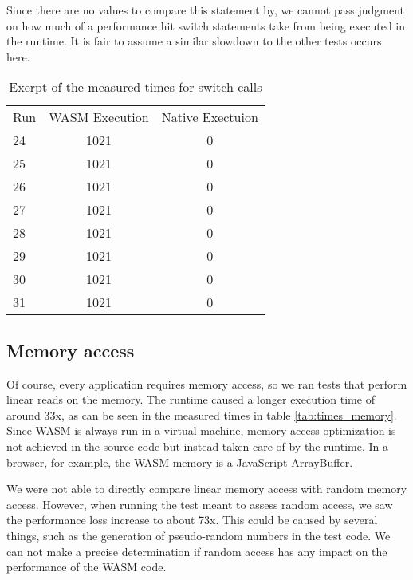 Since there are no values to compare this statement by, we cannot pass judgment on how much of a performance hit switch statements take from being executed in the runtime. It is fair to assume a similar slowdown to the other tests occurs here.

\begin{table} [h]
    \begin{tabular}{l c c}
        Run & WASM Execution & Native Exectuion \\
        24  & 1021           & 0                \\
        25  & 1021           & 0                \\
        26  & 1021           & 0                \\
        27  & 1021           & 0                \\
        28  & 1021           & 0                \\
        29  & 1021           & 0                \\
        30  & 1021           & 0                \\
        31  & 1021           & 0                \\
    \end{tabular}
    \caption{Exerpt of the measured times for switch calls}
    \label{tab:times_switch}
\end{table}

\subsection{Memory access}

Of course, every application requires memory access, so we ran tests that perform linear reads on the memory. The runtime caused a longer execution time of around 33x, as can be seen in the measured times in table \ref{tab:times_memory}. Since WASM is always run in a virtual machine, memory access optimization is not achieved in the source code but instead taken care of by the runtime. In a browser, for example, the WASM memory is a JavaScript ArrayBuffer.

We were not able to directly compare linear memory access with random memory access. However, when running the test meant to assess random access, we saw the performance loss increase to about 73x. This could be caused by several things, such as the generation of pseudo-random numbers in the test code. We can not make a precise determination if random access has any impact on the performance of the WASM code.

